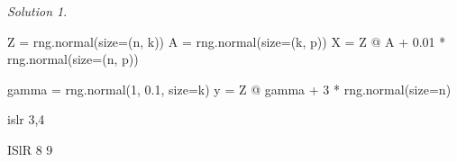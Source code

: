 \documentclass[
  english,
]{article}
\newenvironment{Shaded}{\begin{snugshade}}{\end{snugshade}}
\newcommand{\DecValTok}[1]{\textcolor[rgb]{0.68,0.00,0.00}{#1}}
\newcommand{\FloatTok}[1]{\textcolor[rgb]{0.68,0.00,0.00}{#1}}
\newcommand{\NormalTok}[1]{\textcolor[rgb]{0.00,0.23,0.31}{#1}}
\newcommand{\OperatorTok}[1]{\textcolor[rgb]{0.37,0.37,0.37}{#1}}
\theoremstyle{definition}
\theoremstyle{definition}
\theoremstyle{remark}
\newtheorem*{solution}{Solution}
\begin{document}
\begin{solution}
\begin{Shaded}
\begin{Highlighting}[]
\NormalTok{Z }\OperatorTok{=}\NormalTok{ rng.normal(size}\OperatorTok{=}\NormalTok{(n, k))}
\NormalTok{A }\OperatorTok{=}\NormalTok{ rng.normal(size}\OperatorTok{=}\NormalTok{(k, p))}
\NormalTok{X }\OperatorTok{=}\NormalTok{ Z }\OperatorTok{@}\NormalTok{ A }\OperatorTok{+} \FloatTok{0.01} \OperatorTok{*}\NormalTok{ rng.normal(size}\OperatorTok{=}\NormalTok{(n, p))  }

\NormalTok{gamma }\OperatorTok{=}\NormalTok{ rng.normal(}\DecValTok{1}\NormalTok{, }\FloatTok{0.1}\NormalTok{, size}\OperatorTok{=}\NormalTok{k)}
\NormalTok{y }\OperatorTok{=}\NormalTok{ Z }\OperatorTok{@}\NormalTok{ gamma }\OperatorTok{+} \DecValTok{3} \OperatorTok{*}\NormalTok{ rng.normal(size}\OperatorTok{=}\NormalTok{n)}
\end{Highlighting}
\end{Shaded}

\end{solution}

islr 3,4

ISlR 8 9
\end{document}
